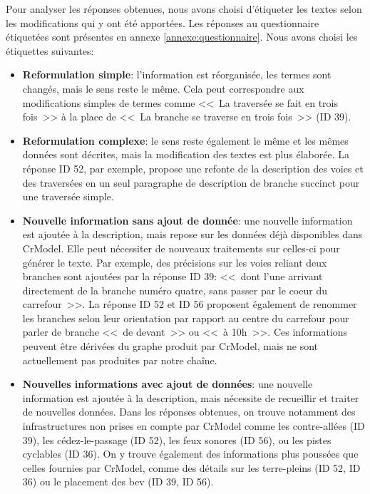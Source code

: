 \newpar{}

\begin{samepage}
    Pour analyser les réponses obtenues, nous avons choisi d'étiqueter les textes selon les modifications qui y ont été apportées. Les réponses au questionnaire étiquetées sont présentes en annexe \ref{annexe:questionnaire}. Nous avons choisi les étiquettes suivantes:

    \begin{itemize}
        \item \textbf{Reformulation simple}: l'information est réorganisée, les termes sont changés, mais le sens reste le même. Cela peut correspondre aux modifications simples de termes comme <<~La traversée se fait en trois fois~>> à la place de <<~La branche se traverse en trois fois~>> (ID 39).
        \item \textbf{Reformulation complexe}: le sens reste également le même et les mêmes données sont décrites, mais la modification des textes est plus élaborée. La réponse ID 52, par exemple, propose une refonte de la description des voies et des traversées en un seul paragraphe de description de branche succinct pour une traversée simple.
        \item \textbf{Nouvelle information sans ajout de donnée}: une nouvelle information est ajoutée à la description, mais repose sur les données déjà disponibles dans CrModel. Elle peut nécessiter de nouveaux traitements sur celles-ci pour générer le texte. Par exemple, des précisions sur les voies reliant deux branches sont ajoutées par la réponse ID 39: <<~dont l’une arrivant directement de la branche numéro quatre, sans passer par le coeur du carrefour~>>. La réponse ID 52 et ID 56 proposent également de renommer les branches selon leur orientation par rapport au centre du carrefour pour parler de branche <<~de devant~>> ou <<~à 10h~>>. Ces informations peuvent être dérivées du graphe produit par CrModel, mais ne sont actuellement pas produites par notre chaîne.
        \item \textbf{Nouvelles informations avec ajout de données}: une nouvelle information est ajoutée à la description, mais nécessite de recueillir et traiter de nouvelles données. Dans les réponses obtenues, on trouve notamment des infrastructures non prises en compte par CrModel comme les contre-allées (ID 39), les cédez-le-passage (ID 52), les feux sonores (ID 56), ou les pistes cyclables (ID 36). On y trouve également des informations plus poussées que celles fournies par CrModel, comme des détails sur les terre-pleins (ID 52, ID 36) ou le placement des \gls{bev} (ID 39, ID 56).
    \end{itemize}
\end{samepage}


